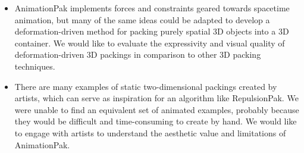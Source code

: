 \begin{itemize}
\item AnimationPak implements forces and constraints geared towards 
	spacetime animation, but many of the same ideas could be adapted
	to develop a deformation-driven method for packing purely spatial
	3D objects into a 3D container.  We would like to evaluate the
	expressivity and visual quality of deformation-driven 3D packings 
	in comparison to other 3D packing techniques.




\item {} There are many examples of static two-dimensional packings
	created by artists, which can
	serve as inspiration for an algorithm like RepulsionPak.  We were
	unable to find an equivalent set of animated examples, probably
	because they would be difficult and time-consuming to create by hand.
	We would like
	to engage with artists to understand the aesthetic value and limitations
	of AnimationPak.

\end{itemize}



